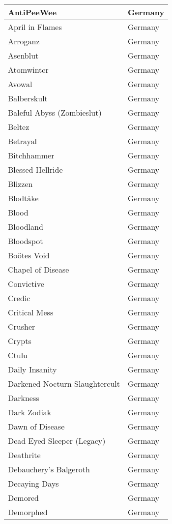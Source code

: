 \documentclass[12pt, a4paper, twoside]{report}
\begin{document}
\begin{center}
\begin{longtable}{|p{5cm}|p{5cm}|}
AntiPeeWee & Germany \\ \hline
April in Flames & Germany \\ \hline
Arroganz & Germany \\ \hline
Asenblut & Germany \\ \hline
Atomwinter & Germany \\ \hline
Avowal & Germany \\ \hline
Balberskult & Germany \\ \hline
Baleful Abyss (Zombieslut) & Germany \\ \hline
Beltez & Germany \\ \hline
Betrayal & Germany \\ \hline
Bitchhammer & Germany \\ \hline
Blessed Hellride & Germany \\ \hline
Blizzen & Germany \\ \hline
Blodtåke & Germany \\ \hline
Blood & Germany \\ \hline
Bloodland & Germany \\ \hline
Bloodspot & Germany \\ \hline
Boötes Void & Germany \\ \hline
Chapel of Disease & Germany \\ \hline
Convictive & Germany \\ \hline
Credic & Germany \\ \hline
Critical Mess & Germany \\ \hline
Crusher & Germany \\ \hline
Crypts & Germany \\ \hline
Ctulu & Germany \\ \hline
Daily Insanity & Germany \\ \hline
Darkened Nocturn Slaughtercult & Germany \\ \hline
Darkness & Germany \\ \hline
Dark Zodiak & Germany \\ \hline
Dawn of Disease & Germany \\ \hline
Dead Eyed Sleeper (Legacy) & Germany \\ \hline
Deathrite & Germany \\ \hline
Debauchery's Balgeroth & Germany \\ \hline
Decaying Days & Germany \\ \hline
Demored & Germany \\ \hline
Demorphed & Germany \\ \hline

\end{longtable}
\end{center}
\end{document}
